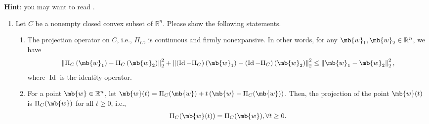 \begin{exercise}
  \newcommand{\Id}{ \operatorname{Id} }
  \textbf{Hint}: you may want to read \cite{hastie2015statistical,wang15a}.
  \begin{enumerate}
    \item Let $C$ be a nonempty closed convex subset of $\mathbb{R}^n$. Please show the following statements.
      \begin{enumerate}
        \item  The projection operator on $C$, i.e., $\Pi_C$, is continuous and firmly nonexpansive. In other words, for any $\mb{w}_{1}, \mb{w}_{2} \in \mathbb{R}^n$, we have
          \begin{align*}
            \left\|\Pi_C\left(\mb{w}_{1}\right)-\Pi_C\left(\mb{w}_{2}\right)\right\|_{2}^{2}+\left\|\left(\Id-\Pi_C\right)\left(\mb{w}_{1}\right)-\left(\Id-\Pi_C\right)\left(\mb{w}_{2}\right)\right\|_{2}^{2} \leq\left\|\mb{w}_{1}-\mb{w}_{2}\right\|_{2}^{2},
          \end{align*}
          where $\Id$ is the identity operator.
          
        \item For a point $\mb{w} \in \mathbb{R}^n$, let $\mb{w}(t)=\Pi_C(\mb{w})+t\left(\mb{w}-\Pi_C(\mb{w})\right) $. Then, the projection of the point $\mb{w}(t)$ is $\Pi_C(\mb{w})$ for all $t \geq 0$, i.e.,
          \begin{align*}
            \Pi_C(\mb{w}(t))=\Pi_C(\mb{w}), \forall t \geq 0.
          \end{align*}
          
          
      \end{enumerate}
      

\end{enumerate}
\end{exercise}

